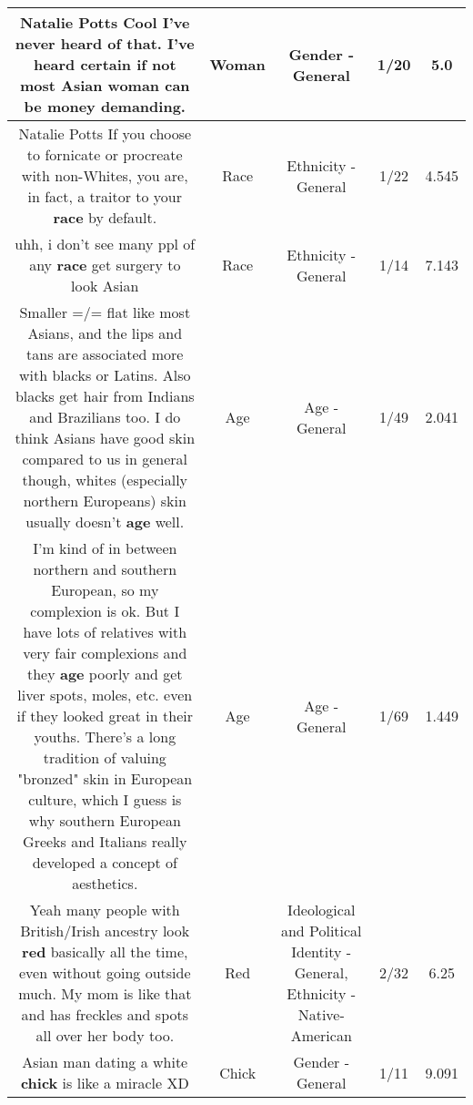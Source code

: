 \documentclass[11pt]{article}
\newlength\mylength
\begin{document}
\begin{center}
\begin{longtable}{|C{.65\mylength}|C{.30\mylength}|C{.12\mylength}|C{.12\mylength}|C{.12\mylength}|}
  \small Natalie Potts Cool I've never heard of that. I've heard certain if not most Asian \textbf{woman} can be money demanding.\normalsize   & Woman & Gender - General & 1/20 & 5.0 \\  \hline
  \small Natalie Potts If you choose to fornicate or procreate with non-Whites, you are, in fact,  a traitor to your \textbf{race} by default.\normalsize   & Race & Ethnicity - General & 1/22 & 4.545 \\  \hline
  \small uhh, i don't see many ppl of any \textbf{race} get surgery to look Asian\normalsize   & Race & Ethnicity - General & 1/14 & 7.143 \\  \hline
  \small Smaller =/= flat like most Asians, and the lips and tans are associated more with blacks or Latins. Also blacks get hair from Indians and Brazilians too. I do think Asians have good skin compared to us in general though, whites (especially northern Europeans) skin usually doesn't \textbf{age} well.\normalsize   & Age & Age - General & 1/49 & 2.041 \\  \hline
  \small I'm kind of in between northern and southern European, so my complexion is ok. But I have lots of relatives with very fair complexions and they \textbf{age} poorly and get liver spots, moles, etc. even if they looked great in their youths. There's a long tradition of valuing "bronzed" skin in European culture, which I guess is why southern European Greeks and Italians really developed a concept of aesthetics.\normalsize   & Age & Age - General & 1/69 & 1.449 \\  \hline
  \small Yeah many people with British/Irish ancestry look \textbf{r\textbf{ed}} basically all the time, even without going outside much. My mom is like that and has freckles and spots all over her body too.\normalsize   & Red &  Ideological and Political Identity - General, Ethnicity - Native-American & 2/32 & 6.25 \\  \hline
  \small Asian man dating a white \textbf{chick} is like a miracle XD\normalsize   & Chick & Gender - General & 1/11 & 9.091 \\  \hline

\end{longtable}
\end{center}
\end{document}
